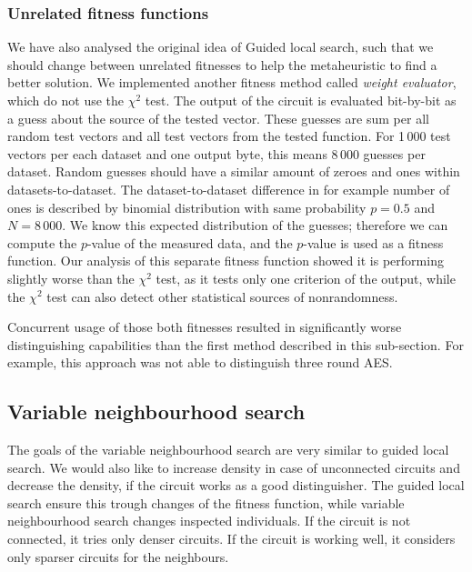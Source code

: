 \documentclass[
  print, %
  Table,   %
  nolof,     %
  nolot,     %
  11pt, %
  oneside  %
]{fithesis3}
\begin{document}
\subsubsection{\textbf{Unrelated fitness functions}}

We have also analysed the original idea of Guided local search, such that we should change between unrelated fitnesses to help the metaheuristic to find a better solution. We implemented another fitness method called \textit{weight evaluator}, which do not use the $\chi^{2}$ test. The output of the circuit is evaluated bit-by-bit as a guess about the source of the tested vector. These guesses are sum per all random test vectors and all test vectors from the tested function. For 1\,000 test vectors per each dataset and one output byte, this means 8\,000 guesses per dataset. Random guesses should have a similar amount of zeroes and ones within datasets-to-dataset. The dataset-to-dataset difference in for example number of ones is described by binomial distribution with same probability $p = 0.5$ and $N = 8\,000$. We know this expected distribution of the guesses; therefore we can compute the $p$-value of the measured data, and the $p$-value is used as a fitness function. Our analysis of this separate fitness function showed it is performing slightly worse than the $\chi^{2}$ test, as it tests only one criterion of the output, while the $\chi^{2}$ test can also detect other statistical sources of nonrandomness.

Concurrent usage of those both fitnesses resulted in significantly worse distinguishing capabilities than the first method described in this sub-section. For example, this approach was not able to distinguish three round AES.


\subsection{Variable neighbourhood search}
\label{subsec:res-ss-vns}

The goals of the variable neighbourhood search are very similar to guided local search. We would also like to increase density in case of unconnected circuits and decrease the density, if the circuit works as a good distinguisher. The guided local search ensure this trough changes of the fitness function, while variable neighbourhood search changes inspected individuals. If the circuit is not connected, it tries only denser circuits. If the circuit is working well, it considers only sparser circuits for the neighbours.
\end{document}
